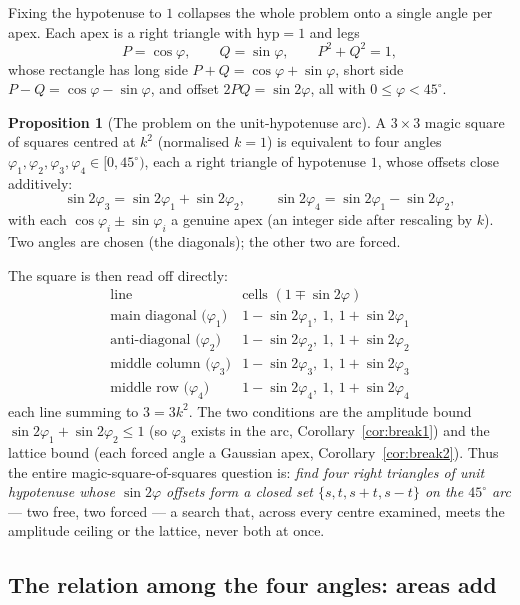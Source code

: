 \documentclass[11pt]{article}
\theoremstyle{definition}
\newtheorem{proposition}{Proposition}
\begin{document}
Fixing the hypotenuse to $1$ collapses the whole problem onto a single angle per
apex. Each apex is a right triangle with $\mathrm{hyp}=1$ and legs
\[
  P=\cos\varphi,\qquad Q=\sin\varphi,\qquad P^{2}+Q^{2}=1,
\]
whose rectangle has long side $P+Q=\cos\varphi+\sin\varphi$, short side
$P-Q=\cos\varphi-\sin\varphi$, and offset $2PQ=\sin2\varphi$, all with
$0\le\varphi<45^{\circ}$.

\begin{proposition}[The problem on the unit-hypotenuse arc]\label{prop:closing}
A $3\times3$ magic square of squares centred at $k^{2}$ (normalised $k=1$) is
equivalent to four angles $\varphi_1,\varphi_2,\varphi_3,\varphi_4\in[0,45^{\circ})$,
each a right triangle of hypotenuse $1$, whose offsets close additively:
\[
  \sin2\varphi_3=\sin2\varphi_1+\sin2\varphi_2,\qquad
  \sin2\varphi_4=\sin2\varphi_1-\sin2\varphi_2,
\]
with each $\cos\varphi_i\pm\sin\varphi_i$ a genuine apex (an integer side after
rescaling by $k$). Two angles are chosen (the diagonals); the other two are
forced.
\end{proposition}

\noindent The square is then read off directly:
\[
  \begin{array}{c|c}
  \text{line} & \text{cells }(1\mp\sin2\varphi)\\\hline
  \text{main diagonal (}\varphi_1) & 1-\sin2\varphi_1,\ 1,\ 1+\sin2\varphi_1\\
  \text{anti-diagonal (}\varphi_2) & 1-\sin2\varphi_2,\ 1,\ 1+\sin2\varphi_2\\
  \text{middle column (}\varphi_3) & 1-\sin2\varphi_3,\ 1,\ 1+\sin2\varphi_3\\
  \text{middle row (}\varphi_4) & 1-\sin2\varphi_4,\ 1,\ 1+\sin2\varphi_4
  \end{array}
\]
each line summing to $3=3k^{2}$. The two conditions are the amplitude bound
$\sin2\varphi_1+\sin2\varphi_2\le1$ (so $\varphi_3$ exists in the arc,
Corollary~\ref{cor:break1}) and the lattice bound (each forced angle a Gaussian
apex, Corollary~\ref{cor:break2}). Thus the entire magic-square-of-squares
question is: \emph{find four right triangles of unit hypotenuse whose
$\sin2\varphi$ offsets form a closed set $\{s,t,s+t,s-t\}$ on the
$45^{\circ}$ arc} --- two free, two forced --- a search that, across every centre
examined, meets the amplitude ceiling or the lattice, never both at once.

\subsection*{The relation among the four angles: areas add}
\end{document}
